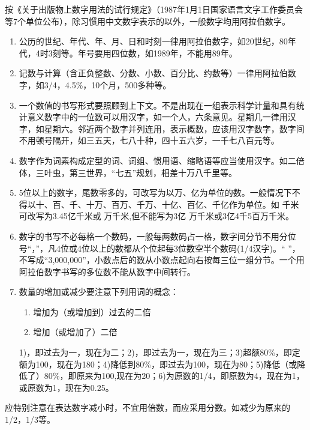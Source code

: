
按《关于出版物上数字用法的试行规定》（1987年1月1日国家语言文字工作委员会等7个单位公布），除习惯用中文数字表示的以外，一般数字均用阿拉伯数字。
\begin{enumerate}%
	\item 公历的世纪、年代、年、月、日和时刻一律用阿拉伯数字，如20世纪，80年代，4时3刻等。年号要用四位数，如1989年，不能用89年。
	\item 记数与计算（含正负整数、分数、小数、百分比、约数等）一律用阿拉伯数字，如3/4，4.5\%，10个月，500多种等。
	\item 一个数值的书写形式要照顾到上下文。不是出现在一组表示科学计量和具有统计意义数字中的一位数可以用汉字，如一个人，六条意见。星期几一律用汉字，如星期六。邻近两个数字并列连用，表示概数，应该用汉字数字，数字间不用顿号隔开，如三五天，七八十种，四十五六岁，一千七八百元等。
	\item 数字作为词素构成定型的词、词组、惯用语、缩略语等应当使用汉字。如二倍体，三叶虫，第三世界，“七五”规划，相差十万八千里等。
	\item 5位以上的数字，尾数零多的，可改写为以万、亿为单位的数。一般情况下不得以十、百、千、十万、百万、千万、十亿、百亿、千亿作为单位。如 千米可改写为3.45亿千米或 万千米,但不能写为3亿 万千米或3亿4千5百万千米。
	\item 数字的书写不必每格一个数码，一般每两数码占一格，数字间分节不用分位号“，”，凡4位或4位以上的数都从个位起每3位数空半个数码(1/4汉字)。“ ”，不写成“3,000,000”，小数点后的数从小数点起向右按每三位一组分节。一个用阿拉伯数字书写的多位数不能从数字中间转行。
	\item 数量的增加或减少要注意下列用词的概念：
	\begin{enumerate}[1）]
		\item 增加为（或增加到）过去的二倍
		\item 增加（或增加了）二倍
		
	\end{enumerate}
	1)，即过去为一，现在为二；2)，即过去为一，现在为三；3)超额80\%，即定额为100，现在为180；4)降低到80\%，即过去为100，现在为80；5)降低（或降低了）80\%，即原来为100,现在为20；6)为原数的1/4，即原数为4，现在为1，或原数为1，现在为0.25。
\end{enumerate}


应特别注意在表达数字减小时，不宜用倍数，而应采用分数。如减少为原来的1/2，1/3等。
